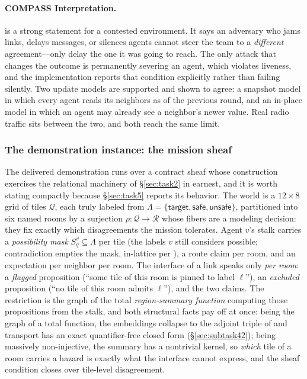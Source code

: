 \documentclass[11pt]{article}
\theoremstyle{definition}
\theoremstyle{remark}
\begin{document}
\paragraph{COMPASS Interpretation.}
 is a strong statement for a contested environment.
It says an adversary who jams links, delays messages, or silences agents cannot steer the team
to a \emph{different} agreement---only delay the one it was going to reach.
The only attack that changes the outcome is permanently severing an agent, which violates
liveness, and the implementation reports that condition explicitly rather than failing
silently.
Two update models are supported and shown to agree: a snapshot model in which every agent reads
its neighbors as of the previous round, and an in-place model in which an agent may already see
a neighbor's newer value.
Real radio traffic sits between the two, and both reach the same limit.

\subsubsection{The demonstration instance: the mission sheaf}
\label{sec:mission-sheaf}

The delivered demonstration runs  over a contract sheaf whose construction
exercises the relational machinery of \S\ref{sec:task2} in earnest, and it is worth stating
compactly because \S\ref{sec:task5} reports its behavior.
The world is a $12 \times 8$ grid of tiles $\mathcal{Q}$, each truly labeled from
$\Lambda = \{\mathsf{target}, \mathsf{safe}, \mathsf{unsafe}\}$, partitioned into six named
rooms by a surjection $\rho \colon \mathcal{Q} \to \mathcal{R}$ whose fibers are a modeling
decision: they fix exactly which disagreements the mission tolerates.
Agent $v$'s stalk carries a \emph{possibility mask} $S^v_q \subseteq \Lambda$ per tile (the
labels $v$ still considers possible; contradiction empties the mask, in-lattice per
), a route claim per room, and an expectation per neighbor per room.
The interface of a link speaks only \emph{per room}: a \emph{flagged} proposition (``some tile
of this room is pinned to label $\ell$''), an \emph{excluded} proposition (``no tile of this
room admits $\ell$''), and the two claims.
The restriction is the graph of the total \emph{region-summary function} computing those
propositions from the stalk, and both structural facts pay off at once: being the graph of a
total function, the embeddings collapse to the adjoint triple of  and
transport has an exact quantifier-free closed form (\S\ref{sec:subtask42}); being massively
non-injective, the summary has a nontrivial kernel, so \emph{which} tile of a room carries a
hazard is exactly what the interface cannot express, and the sheaf condition closes over
tile-level disagreement.
\end{document}
